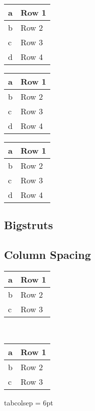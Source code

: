 	
		{
		\setlength{\extrarowheight}{1.0pt}
		\begin{tabular}{|l|l|}
		\hline
		a & Row 1 \\ \hline
		b & Row 2 \\ \hline
		c & Row 3 \\ \hline
		d & Row 4 \\ \hline
		\end{tabular}
		}
		{
		\setlength{\extrarowheight}{1.5pt}
		\begin{tabular}{|l|l|}
		\hline
		a & Row 1 \\ \hline
		b & Row 2 \\ \hline
		c & Row 3 \\ \hline
		d & Row 4 \\ \hline
		\end{tabular}
		}
		{
		\setlength{\extrarowheight}{2.0pt}
		\begin{tabular}{|l|l|}
		\hline
		a & Row 1 \\ \hline
		b & Row 2 \\ \hline
		c & Row 3 \\ \hline
		d & Row 4 \\ \hline
		\end{tabular}
		}


	\clearpage %
	\subsection{Bigstruts}
	
	
	
	
	\clearpage
	\subsection{Column Spacing}
	

			\begin{tabular}{|l|l|}
			\hline
			a & Row 1 \\ \hline
			b & Row 2 \\ \hline
			c & Row 3 \\ \hline
			\end{tabular}\\

			\setlength{\tabcolsep}{6pt}
			\begin{tabular}{|l|l|}
			\hline
			a & Row 1 \\ \hline
			b & Row 2 \\ \hline
			c & Row 3 \\ \hline
			\end{tabular}			tabcolsep = 6pt
		
